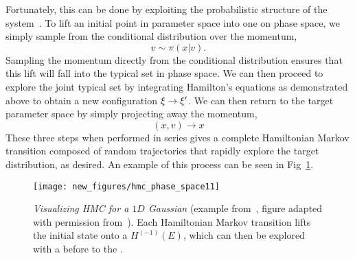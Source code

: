 Fortunately, this can be done by exploiting the probabilistic structure of the
system~\cite{Betancourt_2017}.
%
To lift an initial point in parameter space into one on phase space, we simply
sample from the conditional distribution over the momentum,
%
\begin{equation}
v \sim \pi(x | v).
\end{equation}
%
Sampling the momentum directly from the conditional distribution ensures that
this lift will fall into the typical set in phase space.
%
We can then proceed to explore the joint typical set by integrating Hamilton's
equations as demonstrated above to obtain a new configuration $\xi \rightarrow
{\xi^{\prime}}$.
%
We can then return to the target parameter space by simply projecting away the
momentum,
%
\begin{equation}
(x, v) \rightarrow x
\end{equation}
%
These three steps when performed in series gives a complete Hamiltonian Markov
transition composed of random trajectories that rapidly explore the target
distribution, as desired.
%
An example of this process can be seen in Fig~\ref{fig:hmc_phase_space}.
%
\begin{figure}[htpb]
\texttt{[image: new\_figures/hmc\_phase\_space11]}
\caption{\emph{Visualizing HMC for a $1D$ Gaussian} (example
  from~\cite{Betancourt_2017}, figure adapted with permission
  from~\cite{joeyl2hmc}). Each Hamiltonian Markov transition lifts the
  initial state onto a \color{gray}{random level set of the Hamiltonian,
  }\color{black} $H^{(-1)}(E)$, which can then be explored with a
  \color{blue}{Hamiltonian trajectory }\color{black} before
  \color{red}{projecting back down }\color{black} to the \color{green}{target
  parameter space}\color{black}.}%
\label{fig:hmc_phase_space}
\end{figure}
%
\vspace{-10pt}
